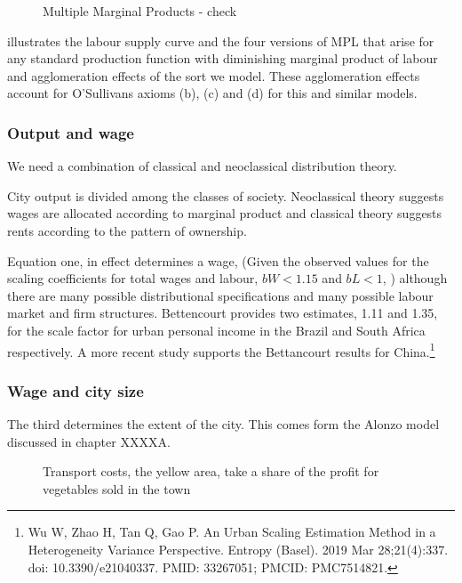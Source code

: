 \begin{figure}[tb]
\begin{center}

\caption{Multiple Marginal Products - check}
\label{fig-growth-amenity.tex}
\end{center}
\end{figure}

 illustrates the labour supply curve and the four versions of MPL that arise for any standard production function with diminishing marginal product of labour and agglomeration effects of the sort we model. These agglomeration effects account for O'Sullivans axioms (b), (c) and (d) for this and similar models. 

 
\subsubsection{Output and wage}
We need a combination of classical and neoclassical distribution theory.

City output is divided among the classes of society. Neoclassical theory suggests wages are allocated according to marginal product and classical theory suggests rents according to the pattern of ownership.

Equation one, in effect determines a wage, (Given the observed values for the scaling coefficients for total wages and labour, $bW < 1.15$ and $bL < 1$, )  although there are many possible distributional specifications and many possible labour market and firm structures. Bettencourt provides two  estimates,  1.11 and 1.35, for the scale factor for urban personal income in the Brazil and South Africa respectively. A more recent  study supports the Bettancourt results for China.\footnote{Wu W, Zhao H, Tan Q, Gao P. An Urban Scaling Estimation Method in a Heterogeneity Variance Perspective. Entropy (Basel). 2019 Mar 28;21(4):337. doi: 10.3390/e21040337. PMID: 33267051; PMCID: PMC7514821.} 

\subsubsection{Wage and city size}
The third determines the extent of the city. This comes form the Alonzo model discussed in chapter XXXXA. 

\begin{figure}
    \begin{center}
    
    \caption{Transport costs, the yellow area, take a share of the profit for vegetables sold in the town}
    \end{center}
\end{figure}

